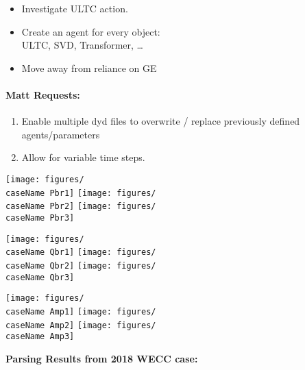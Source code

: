 \documentclass[12pt]{article}
\begin{document}
\begin{multicols}{2}
\begin{itemize}
		\item Investigate ULTC action.

		\item Create an agent for every object: \\ ULTC, SVD, Transformer, \ldots

		\item Move away from reliance on GE
		
\end{itemize}

\paragraph{Matt Requests:}
\begin{enumerate}
		\item Enable multiple dyd files to overwrite / replace previously defined agents/parameters
		\item Allow for variable time steps.
\end{enumerate}

\vfill\null
\end{multicols}

\pagebreak

\newcommand{\caseName}{SixMachineRamp1}
\begin{landscape}

\texttt{[image: figures/\\caseName Pbr1]}%
\texttt{[image: figures/\\caseName Pbr2]}%
\texttt{[image: figures/\\caseName Pbr3]}

\texttt{[image: figures/\\caseName Qbr1]}%
\texttt{[image: figures/\\caseName Qbr2]}%
\texttt{[image: figures/\\caseName Qbr3]}

\texttt{[image: figures/\\caseName Amp1]}%
\texttt{[image: figures/\\caseName Amp2]}%
\texttt{[image: figures/\\caseName Amp3]}

\end{landscape}
\pagebreak

\textbf{Parsing Results from 2018 WECC case:}






		
\end{document}
